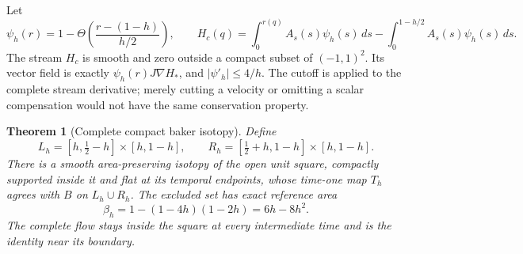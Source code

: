 \documentclass[11pt]{article}
\numberwithin{equation}{section}
\newtheorem{theorem}{Theorem}[section]
\theoremstyle{definition}
\theoremstyle{remark}
\begin{document}
Let
\[
 \psi_h(r)=1-\Theta\!\left(\frac{r-(1-h)}{h/2}\right),
 \qquad
 H_c(q)=\int_0^{r(q)}A_s(s)\psi_h(s)\,ds
             -\int_0^{1-h/2}A_s(s)\psi_h(s)\,ds .
\]
The stream $H_c$ is smooth and zero outside a compact subset
of $(-1,1)^2$. Its vector field is exactly
$\psi_h(r)J\nabla H_*$, and $|\psi'_h|\leq4/h$.
The cutoff is applied to the complete stream derivative; merely
cutting a velocity or omitting a scalar compensation would not
have the same conservation property.

\begin{theorem}[Complete compact baker isotopy]\label{p2c:thm:baker}
Define
\[
 L_h=[h,\tfrac12-h]\times[h,1-h],\qquad
 R_h=[\tfrac12+h,1-h]\times[h,1-h].
\]
There is a smooth area-preserving isotopy of the open unit square,
compactly supported inside it and flat at its temporal endpoints,
whose time-one map $T_h$ agrees with $B$ on $L_h\cup R_h$.
The excluded set has exact reference area
\begin{equation}\label{p2c:eq:collar}
 \beta_h=1-(1-4h)(1-2h)=6h-8h^2.
\end{equation}
The complete flow stays inside the square at every intermediate
time and is the identity near its boundary.
\end{theorem}
\end{document}
